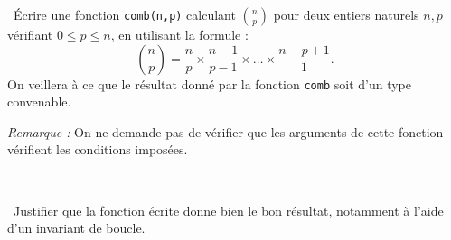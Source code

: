 
\question\ Écrire une fonction \texttt{comb(n,p)} calculant $\displaystyle\binom{n}{p}$ pour deux entiers naturels $n,p$ vérifiant $0 \leq p \leq n$, en utilisant la formule :
    \begin{equation*}
      \binom{n}{p} = \dfrac{n}{p} \times \dfrac{n-1}{p-1} \times \dots \times \dfrac{n-p+1}{1}.
    \end{equation*}
    On veillera à ce que le résultat donné par la fonction \texttt{comb} soit d'un type convenable. 
    
    \emph{Remarque :} On ne demande pas de vérifier que les arguments de cette fonction vérifient les conditions imposées. 

\medskip\    
    
\question\ Justifier que la fonction écrite donne bien le bon résultat, notamment à l'aide d'un invariant de boucle.  
